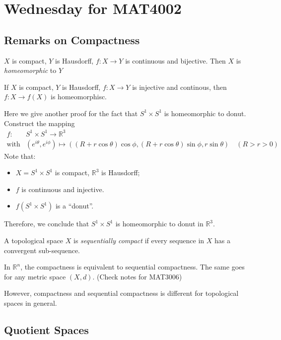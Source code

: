 \section{Wednesday for MAT4002}
\subsection{Remarks on Compactness}

\begin{theorem}
$X$ is compact, $Y$ is Hausdorff, $f:X\to Y$ is continuous and bijective. Then $X$ is \emph{homeomorphic} to $Y$
\end{theorem}

\begin{corollary}
If $X$ is compact, $Y$ is Hausdorff, $f:X\to Y$ is injective and continous, then
$f:X\to f(X)$ is homeomorphisc.
\end{corollary}
\begin{example}
Here we give another proof for the fact that $S^1\times S^1$ is homeomorphic to donut. Construct the mapping
\[
\begin{array}{ll}
f:&S^1\times S^1\to\mathbb{R}^3\\
\text{with}&(e^{i\theta},e^{i\phi})\mapsto((R+r\cos\theta)\cos\phi,(R+r\cos\theta)\sin\phi,r\sin\theta)\quad (R>r>0)
\end{array}
\]
Note that:
\begin{itemize}
\item
$X=S^1\times S^1$ is compact, $\mathbb{R}^3$ is Hausdorff;
\item
$f$ is continuous and injective.
\item
$f(S^1\times S^1)$ is a ``donut''.
\end{itemize}
Therefore, we conclude that $S^1\times S^1$ is homeomorphic to donut in $\mathbb{R}^3$.
\end{example}

\begin{definition}
A topological space $X$ is \emph{sequentially compact} if every sequence in $X$ has a convergent sub-sequence.
\end{definition}

In $\mathbb{R}^n$, the compactness is equivalent to sequential compactness. The same goes for any metric space $(X,d)$. (Check notes for MAT3006)

However, compactness and sequential compactness is different for topological spaces in general.

\subsection{Quotient Spaces}
